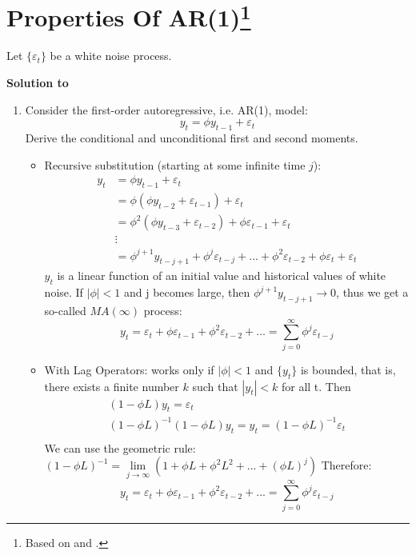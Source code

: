 \documentclass[a4paper]{scrartcl}
\begin{document}
\section[Properties of AR(1)]{Properties Of AR(1)\footnote{Based on \citet[Ch.~2]{BjornlandThorsrud.2015} and \citet{Luetkepohl.2004}.}}\label{ex:PropertiesAR1}
Let $\{\varepsilon_t\}$ be a white noise process.
\begin{solution}\textbf{Solution to }
\end{solution}
\begin{enumerate}
	\item Consider the first-order autoregressive, i.e. AR(1), model:  $$y_t = \phi y_{t-1} + \varepsilon_{t}$$ Derive the conditional and unconditional first and second moments.
	\begin{solution}
		\begin{itemize}
			\item Recursive substitution (starting at some infinite time $j$):
			\begin{align*}
			y_t &= \phi y_{t-1} + \varepsilon_t\\
			&= \phi \left( \phi y_{t-2} + \varepsilon_{t-1}\right) + \varepsilon_t\\ 
			&= \phi^2(\phi y_{t-3} + \varepsilon_{t-2} ) + \phi \varepsilon_{t-1} + \varepsilon_t\\
			&\vdots\\
			& = \phi^{j+1} y_{t-{j+1}}+\phi^j \varepsilon_{t-j}+...+\phi^2 \varepsilon_{t-2} + \phi \varepsilon_t + \varepsilon_t
			\end{align*}
			$y_t$ is a linear function of an initial value and historical values of white noise. If $|\phi|<1$ and j becomes large, then $ \phi^{j+1} y_{t-{j+1}} \rightarrow 0$, thus we get a so-called $MA(\infty)$ process:
			$$y_t = \varepsilon_t + \phi \varepsilon_{t-1} + \phi^2 \varepsilon_{t-2}+... = \sum_{j=0}^\infty \phi^j \varepsilon_{t-j}$$
			\item With Lag Operators: works only if $|\phi| < 1$ and $\{y_t\}$ is bounded, that is, there exists a finite number $k$ such that $|y_t| < k$ for all t. Then
			\begin{align*}
			(1-\phi L) y_t = \varepsilon_t\\
			(1-\phi L)^{-1}(1-\phi L) y_t =	y_t = (1-\phi L)^{-1}\varepsilon_t\\
			\end{align*}
			We can use the geometric rule: $(1-\phi L)^{-1} = \lim\limits_{j\rightarrow \infty}(1+\phi L + \phi^2 L^2+...+(\phi L)^j)$
			Therefore:$$y_t = \varepsilon_t + \phi \varepsilon_{t-1} + \phi^2 \varepsilon_{t-2}+... = \sum_{j=0}^\infty \phi^j \varepsilon_{t-j}$$	
			

\end{itemize}
\end{solution}
\end{enumerate}
\end{document}
